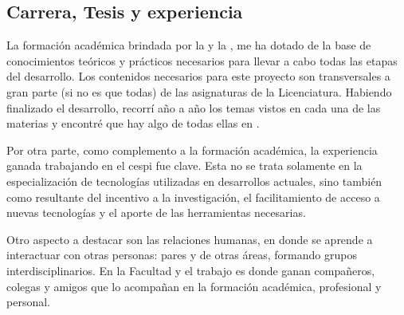\subsection{Carrera, Tesis y experiencia}
\label{conclusion_carrera}

La formación académica brindada por la \unlp{} y la \facultad{}, me ha dotado de la base de conocimientos teóricos y prácticos necesarios para llevar a cabo todas las etapas del desarrollo. Los contenidos necesarios para este proyecto son transversales a gran parte (si no es que todas) de las asignaturas de la Licenciatura. Habiendo finalizado el desarrollo, recorrí año a año los temas vistos en cada una de las materias y encontré que hay algo de todas ellas en \nombreApp{}. 

Por otra parte, como complemento a la formación académica, la experiencia ganada trabajando en el \gls{cespi} fue clave. Esta no se trata solamente en la especialización de tecnologías utilizadas en desarrollos actuales, sino también como resultante del incentivo a la investigación, el facilitamiento de acceso a nuevas tecnologías y el aporte de las herramientas necesarias. 

Otro aspecto a destacar son las relaciones humanas, en donde se aprende a interactuar con otras personas: pares y de otras áreas, formando grupos interdisciplinarios. En la Facultad y el trabajo es donde ganan compañeros, colegas y amigos que lo acompañan en la formación académica, profesional y personal.

